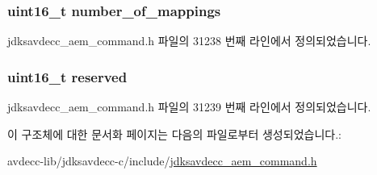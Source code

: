 \subsubsection[{\texorpdfstring{number\+\_\+of\+\_\+mappings}{number_of_mappings}}]{\setlength{\rightskip}{0pt plus 5cm}uint16\+\_\+t number\+\_\+of\+\_\+mappings}\hypertarget{structjdksavdecc__aem__command__remove__video__mappings__response_ac7db472c5622ef473d5d0a5c416d5531}{}\label{structjdksavdecc__aem__command__remove__video__mappings__response_ac7db472c5622ef473d5d0a5c416d5531}


jdksavdecc\+\_\+aem\+\_\+command.\+h 파일의 31238 번째 라인에서 정의되었습니다.

\subsubsection[{\texorpdfstring{reserved}{reserved}}]{\setlength{\rightskip}{0pt plus 5cm}uint16\+\_\+t reserved}\hypertarget{structjdksavdecc__aem__command__remove__video__mappings__response_a5a6ed8c04a3db86066924b1a1bf4dad3}{}\label{structjdksavdecc__aem__command__remove__video__mappings__response_a5a6ed8c04a3db86066924b1a1bf4dad3}


jdksavdecc\+\_\+aem\+\_\+command.\+h 파일의 31239 번째 라인에서 정의되었습니다.



이 구조체에 대한 문서화 페이지는 다음의 파일로부터 생성되었습니다.\+:\begin{DoxyCompactItemize}
\item 
avdecc-\/lib/jdksavdecc-\/c/include/\hyperlink{jdksavdecc__aem__command_8h}{jdksavdecc\+\_\+aem\+\_\+command.\+h}\end{DoxyCompactItemize}
